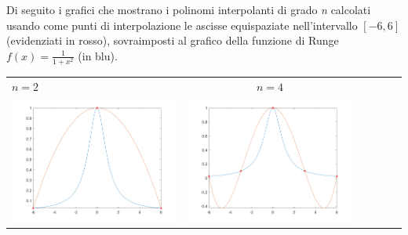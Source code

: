 \begin{center}
\footnotesize\noindent{}\end{center}

\noindent Di seguito i grafici che mostrano i polinomi interpolanti di grado \textit{n} calcolati usando come punti di interpolazione le ascisse equispaziate nell'intervallo \([-6, 6]\) (evidenziati in rosso), sovraimposti al grafico della funzione di Runge \(f(x) = \frac{1}{1+x^2}\) (in blu). \\


\noindent\small\begin{tabular}{l*{5}{c}}
\hspace{3.5cm}\(n=2\) & \(n=4\) \\
\includegraphics[scale=0.5]{cap4/4_9/2.png} &  \includegraphics[scale=0.5]{cap4/4_9/4.png} \\


\end{tabular}
